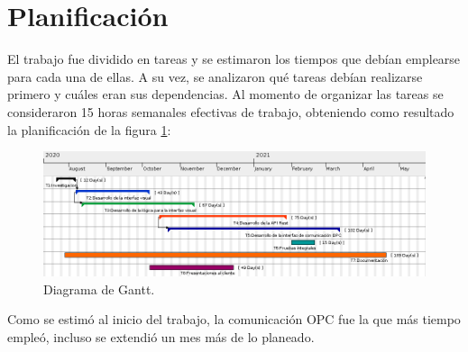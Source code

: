 \pagebreak
\section{Planificación}

El trabajo fue dividido en tareas y se estimaron los tiempos que debían emplearse para cada una de ellas. A su vez, se analizaron qué tareas debían realizarse primero y cuáles eran sus dependencias. Al momento de organizar las tareas se consideraron 15 horas semanales efectivas de trabajo, obteniendo como resultado la planificación de la figura \ref{figure:gantt}:

\begin{figure}[htpb]
	\centering
	\includegraphics[width=14cm]{./Figures/gantt_1.png}
	\caption{Diagrama de Gantt\protect\footnotemark.}
	\label{figure:gantt}
\end{figure}

Como se estimó al inicio del trabajo, la comunicación OPC fue la que más tiempo empleó, incluso se extendió un mes más de lo planeado. 